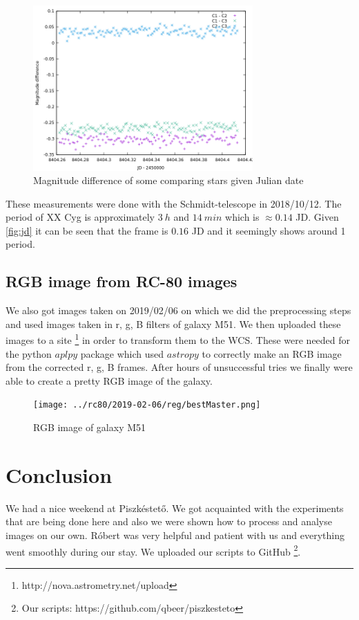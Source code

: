 \documentclass[a4paper,12pt]{article}
\begin{document}
\begin{figure}[H]
    \centering
    \includegraphics[width=0.75\textwidth]{../PSCH-20181012/psch/20181012/mag-jd-comp.png}
    \caption{Magnitude difference of some comparing stars given Julian date}
\end{figure}

\par These measurements were done with the Schmidt-telescope in 2018/10/12. The period of
XX Cyg is approximately $3~h$ and $14~min$ which is $\approx 0.14$ JD. Given \ref{fig:jd} it can be seen that the frame
is $0.16$ JD and it seemingly shows around 1 period.

\subsection{RGB image from RC-80 images}

\par We also got images taken on 2019/02/06 on which we did the preprocessing steps and used images taken in
r, g, B filters of galaxy M51. We then uploaded these images to a site \footnote{http://nova.astrometry.net/upload}
in order to transform them to the WCS. These were needed for the
python $aplpy$ package which used $astropy$ to correctly make an RGB image from the corrected r, g, B 
frames. After hours of unsuccessful tries we finally were able to create a pretty RGB image 
of the galaxy.

\vspace{0.6cm}

\begin{figure}[H]
    \centering
    \texttt{[image: ../rc80/2019-02-06/reg/bestMaster.png]}
    \caption{RGB image of galaxy M51}
\end{figure}

\newpage

\section{ Conclusion}

\par We had a nice weekend at Piszkéstető. We got acquainted with the
experiments that are being done here and also we were shown how to process
and analyse images on our own. Róbert was very helpful and patient with us
and everything went smoothly during our stay. We uploaded our scripts to GitHub 
\footnote{Our scripts: https://github.com/qbeer/piszkesteto}.
\end{document}
